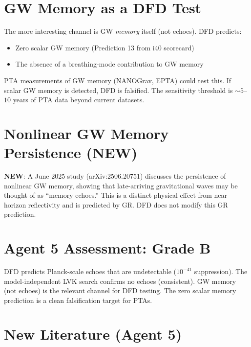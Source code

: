 \documentclass[11pt,a4paper]{article}
\newcommand{\NEW}{\textcolor{dfdblue}{\textbf{NEW}}}
\begin{document}
\section{GW Memory as a DFD Test}

The more interesting channel is GW \emph{memory} itself (not echoes). DFD predicts:
\begin{itemize}
\item Zero scalar GW memory (Prediction 13 from i40 scorecard)
\item The absence of a breathing-mode contribution to GW memory
\end{itemize}

PTA measurements of GW memory (NANOGrav, EPTA) could test this. If scalar GW memory is detected, DFD is falsified. The sensitivity threshold is $\sim 5$--$10$ years of PTA data beyond current datasets.

\section{Nonlinear GW Memory Persistence (NEW)}

\textbf{\NEW}: A June 2025 study (arXiv:2506.20751) discusses the persistence of nonlinear GW memory, showing that late-arriving gravitational waves may be thought of as ``memory echoes.'' This is a distinct physical effect from near-horizon reflectivity and is predicted by GR. DFD does not modify this GR prediction.

\section{Agent 5 Assessment: Grade B}

DFD predicts Planck-scale echoes that are undetectable ($10^{-41}$ suppression). The model-independent LVK search confirms no echoes (consistent). GW memory (not echoes) is the relevant channel for DFD testing. The zero scalar memory prediction is a clean falsification target for PTAs.

\section{New Literature (Agent 5)}
\end{document}
